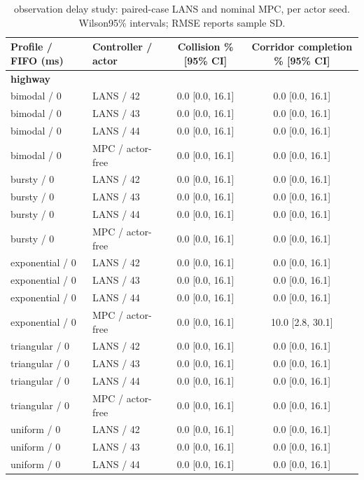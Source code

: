 \begin{longtable}{llcc}
\caption{observation delay study: paired-case LANS and nominal MPC, per actor seed. Wilson95\% intervals; RMSE reports sample SD.}\\
\toprule
Profile / FIFO (ms) & Controller / actor & Collision \% [95\% CI] & Corridor completion \% [95\% CI] \\
\midrule
\multicolumn{4}{l}{\textbf{highway}} \\
bimodal / 0 & LANS / 42 & 0.0 [0.0, 16.1] & 0.0 [0.0, 16.1] \\
bimodal / 0 & LANS / 43 & 0.0 [0.0, 16.1] & 0.0 [0.0, 16.1] \\
bimodal / 0 & LANS / 44 & 0.0 [0.0, 16.1] & 0.0 [0.0, 16.1] \\
bimodal / 0 & MPC / actor-free & 0.0 [0.0, 16.1] & 0.0 [0.0, 16.1] \\
bursty / 0 & LANS / 42 & 0.0 [0.0, 16.1] & 0.0 [0.0, 16.1] \\
bursty / 0 & LANS / 43 & 0.0 [0.0, 16.1] & 0.0 [0.0, 16.1] \\
bursty / 0 & LANS / 44 & 0.0 [0.0, 16.1] & 0.0 [0.0, 16.1] \\
bursty / 0 & MPC / actor-free & 0.0 [0.0, 16.1] & 0.0 [0.0, 16.1] \\
exponential / 0 & LANS / 42 & 0.0 [0.0, 16.1] & 0.0 [0.0, 16.1] \\
exponential / 0 & LANS / 43 & 0.0 [0.0, 16.1] & 0.0 [0.0, 16.1] \\
exponential / 0 & LANS / 44 & 0.0 [0.0, 16.1] & 0.0 [0.0, 16.1] \\
exponential / 0 & MPC / actor-free & 0.0 [0.0, 16.1] & 10.0 [2.8, 30.1] \\
triangular / 0 & LANS / 42 & 0.0 [0.0, 16.1] & 0.0 [0.0, 16.1] \\
triangular / 0 & LANS / 43 & 0.0 [0.0, 16.1] & 0.0 [0.0, 16.1] \\
triangular / 0 & LANS / 44 & 0.0 [0.0, 16.1] & 0.0 [0.0, 16.1] \\
triangular / 0 & MPC / actor-free & 0.0 [0.0, 16.1] & 0.0 [0.0, 16.1] \\
uniform / 0 & LANS / 42 & 0.0 [0.0, 16.1] & 0.0 [0.0, 16.1] \\
uniform / 0 & LANS / 43 & 0.0 [0.0, 16.1] & 0.0 [0.0, 16.1] \\
uniform / 0 & LANS / 44 & 0.0 [0.0, 16.1] & 0.0 [0.0, 16.1] \\

\end{longtable}

